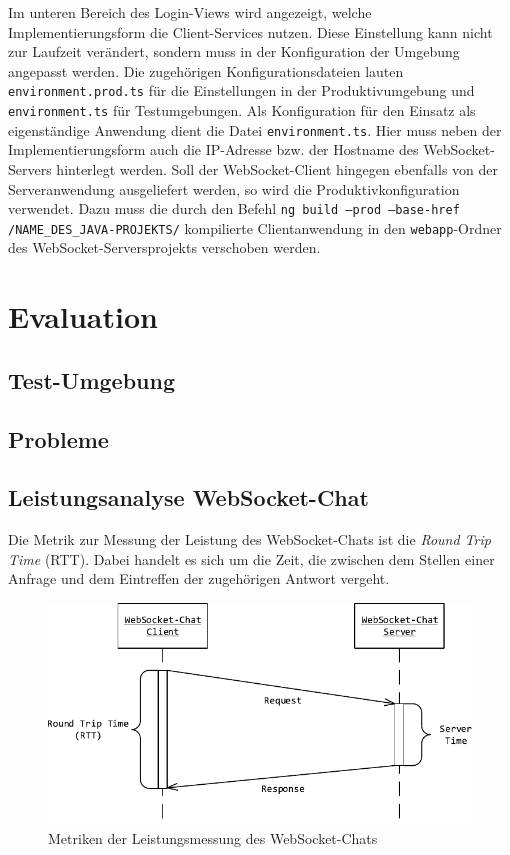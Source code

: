 \documentclass[11pt,a4paper,titlepage]{scrartcl}
\numberwithin{equation}{section}
\begin{document}
\noindent Im unteren Bereich des Login-Views wird angezeigt, welche Implementierungsform die Client-Services nutzen. Diese Einstellung kann nicht zur Laufzeit verändert, sondern muss in der Konfiguration der Umgebung angepasst werden. Die zugehörigen Konfigurationsdateien lauten \texttt{environment.prod.ts} für die Einstellungen in der Produktivumgebung und \texttt{environment.ts} für Testumgebungen. Als Konfiguration für den Einsatz als eigenständige Anwendung dient die Datei \texttt{environment.ts}. Hier muss neben der Implementierungsform auch die IP-Adresse bzw. der Hostname des WebSocket-Servers hinterlegt werden. Soll der WebSocket-Client hingegen ebenfalls von der Serveranwendung ausgeliefert werden, so wird die Produktivkonfiguration verwendet. Dazu muss die durch den Befehl \texttt{ng build --prod --base-href /NAME\_DES\_JAVA-PROJEKTS/} kompilierte Clientanwendung in den \texttt{webapp}-Ordner des WebSocket-Serversprojekts verschoben werden.

\newpage
\section{Evaluation}\label{sec:Evaluation}
\subsection{Test-Umgebung}
\subsection{Probleme}
\subsection{Leistungsanalyse WebSocket-Chat} \label{subsec:Benchmark}
Die Metrik zur Messung der Leistung des WebSocket-Chats ist die \textit{Round Trip Time} (RTT). Dabei handelt es sich um die Zeit, die zwischen dem Stellen einer Anfrage und dem Eintreffen der zugehörigen Antwort vergeht.
\medskip
\begin{figure}[ht] 
	\begin{center}
		\includegraphics[scale=1.0]{img/rtt.pdf}
		\caption{Metriken der Leistungsmessung des WebSocket-Chats}
		\label{fig:RTT}
	\end{center}
\end{figure}
\end{document}
